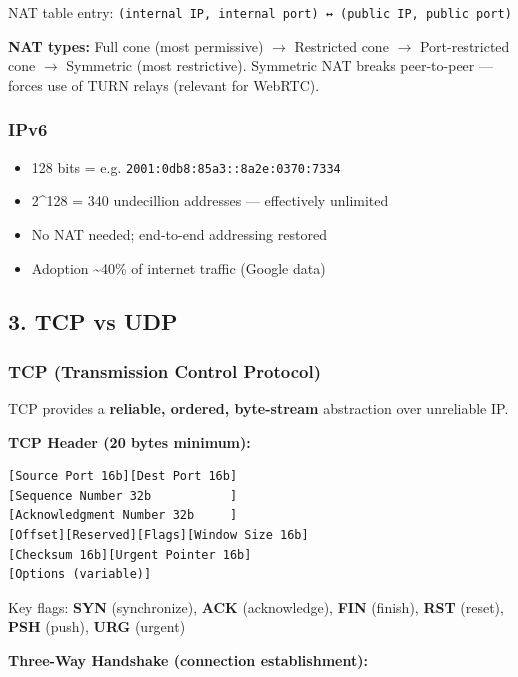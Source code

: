 \documentclass[11pt]{article}
\providecommand{\tightlist}{\setlength{\itemsep}{1pt}\setlength{\parskip}{0pt}}
\begin{document}
NAT table entry: \texttt{(internal\ IP,\ internal\ port)\ ↔\ (public\ IP,\ public\ port)}

\textbf{NAT types:} Full cone (most permissive) \(\rightarrow\) Restricted cone \(\rightarrow\) Port-restricted cone \(\rightarrow\) Symmetric (most restrictive). Symmetric NAT breaks peer-to-peer --- forces use of TURN relays (relevant for WebRTC).

\subsubsection{IPv6}\label{ipv6}

\begin{itemize}
\tightlist
\item
  128 bits = e.g. \texttt{2001:0db8:85a3::8a2e:0370:7334}
\item
  2\^{}128 = 340 undecillion addresses --- effectively unlimited
\item
  No NAT needed; end-to-end addressing restored
\item
  Adoption \textasciitilde40\% of internet traffic (Google data)
\end{itemize}

\subsection{3. TCP vs UDP}\label{3-tcp-vs-udp}

\subsubsection{TCP (Transmission Control Protocol)}\label{tcp-transmission-control-protocol}

TCP provides a \textbf{reliable, ordered, byte-stream} abstraction over unreliable IP.

\textbf{TCP Header (20 bytes minimum):}

\setcodelang{}

\begin{verbatim}
[Source Port 16b][Dest Port 16b]
[Sequence Number 32b           ]
[Acknowledgment Number 32b     ]
[Offset][Reserved][Flags][Window Size 16b]
[Checksum 16b][Urgent Pointer 16b]
[Options (variable)]
\end{verbatim}

Key flags: \textbf{SYN} (synchronize), \textbf{ACK} (acknowledge), \textbf{FIN} (finish), \textbf{RST} (reset), \textbf{PSH} (push), \textbf{URG} (urgent)

\textbf{Three-Way Handshake (connection establishment):}
\end{document}
